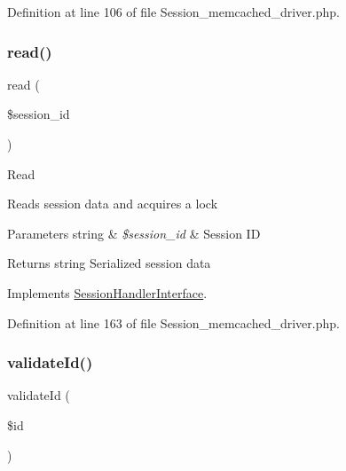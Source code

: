 Definition at line 106 of file Session\+\_\+memcached\+\_\+driver.\+php.

\mbox{\label{class_c_i___session__memcached__driver_a5bbf84ebf657be4eaccc0582377c76bf}} 
\subsubsection{\texorpdfstring{read()}{read()}}
{\footnotesize\ttfamily read (\begin{DoxyParamCaption}\item[{}]{\$session\+\_\+id }\end{DoxyParamCaption})}

Read

Reads session data and acquires a lock


\begin{DoxyParams}[1]{Parameters}
string & {\em \$session\+\_\+id} & Session ID \\
\hline
\end{DoxyParams}
\begin{DoxyReturn}{Returns}
string Serialized session data 
\end{DoxyReturn}


Implements \mbox{\hyperlink{interface_session_handler_interface_a5bbf84ebf657be4eaccc0582377c76bf}{Session\+Handler\+Interface}}.



Definition at line 163 of file Session\+\_\+memcached\+\_\+driver.\+php.

\mbox{\label{class_c_i___session__memcached__driver_a4a58e8f59b2accc199bbebd5ee52bc74}} 
\subsubsection{\texorpdfstring{validateId()}{validateId()}}
{\footnotesize\ttfamily validate\+Id (\begin{DoxyParamCaption}\item[{}]{\$id }\end{DoxyParamCaption})}

